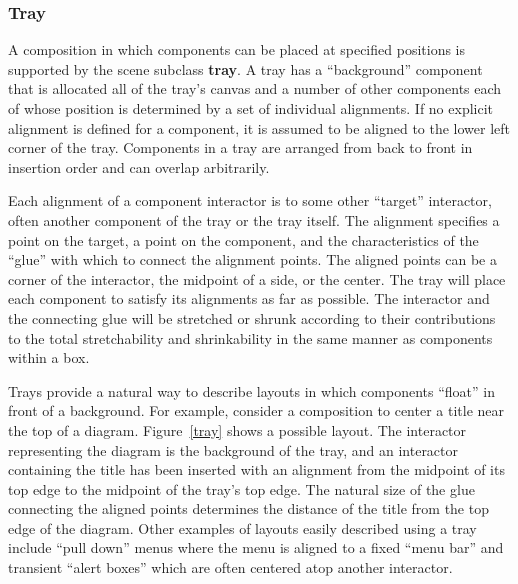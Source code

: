 \subsubsection{Tray}
A composition in which components can be placed at
specified positions is supported by the scene subclass {\bf tray}.
A tray has a ``background'' component that is allocated all of the tray's
canvas and a number of other components each of
whose position is determined by a set of individual alignments.
If no explicit alignment is defined for a
component, it is assumed to be aligned to the lower left corner of the tray.
Components in a tray are arranged from back to front in insertion
order and can overlap arbitrarily.

Each alignment of a component interactor is to some other ``target''
interactor, often another component of the tray or the tray itself.  The
alignment specifies a point on the target, a point on the component,
and the characteristics of the ``glue'' with which to connect the alignment
points.  The aligned points can be a corner of the interactor, the
midpoint of a side, or the center.  The tray will place each component
to satisfy its alignments as far as possible.  The
interactor and the connecting glue will be stretched or shrunk according to
their contributions to the total stretchability and shrinkability
in the same manner as components within a box.

\begin{figure*}
\vspace{2in}
\vspace{1ex}
\caption{A layout using a tray}
\label{tray}
\end{figure*}

Trays provide a natural way to describe layouts in which components
``float'' in front of a background.
For example, consider a composition to center a title near the top
of a diagram.  Figure~\ref{tray} shows a possible layout.
The interactor representing the diagram is
the background of the tray, and an interactor containing the
title has been inserted with an alignment from the midpoint of its top edge
to the midpoint of the tray's top edge.  
The natural size of the glue
connecting the aligned points determines the distance of the title from
the top edge of the diagram.  Other examples of layouts
easily described using a tray include
``pull down'' menus where the menu is aligned to a fixed ``menu bar'' and
transient ``alert boxes'' which are often centered atop another interactor.

